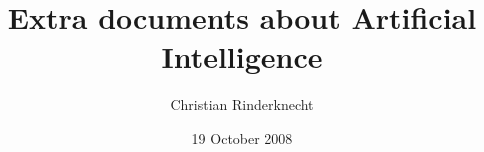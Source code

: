\documentclass[11pt]{article}
\title{Extra documents about Artificial Intelligence}
\author{Christian Rinderknecht}
\date{19 October 2008}
\begin{document}
\frame{\maketitle}

%


%


\end{document}
